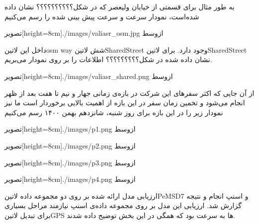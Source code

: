 به طور مثال برای قسمتی از خیابان ولیعصر که در شکل؟؟؟؟؟؟؟؟؟؟ نشان داده شده‌است، نمودار سرعت و سرعت پیش بینی شده را رسم می‌کنیم

  ‌تصویر[height=8cm]{./images/valiasr_osm.jpg}
  ‌ازوسط

 داخل این ‌لاتین{osm way} شش ‌لاتین{SharedStreet} وجود دارد. برای ‌لاتین{SharedStreet} نشان داده شده در شکل؟؟؟؟؟؟؟؟؟ اطلاعات را بر روی نمودار می‌بریم.

  ‌تصویر[height=8cm]{./images/valiasr_shared.png}
  ‌ازوسط

از آن جایی که اکثر سفرهای این شرکت در بازه‌ی زمانی جهار و نیم تا هفت بعد از ظهر انجام می‌شود و تخمین زمان سفر در این بازه از اهمیت بالایی برخوردار است ما نیز نمودار زیر را در این بازه برای روز شنبه، شانزدهم بهمن ۱۴۰۰ رسم می‌کنیم


  ‌تصویر[height=8cm]{./images/p1.png}
  ‌ازوسط


  ‌تصویر[height=8cm]{./images/p2.png}
  ‌ازوسط


  ‌تصویر[height=8cm]{./images/p3.png}
  ‌ازوسط


  ‌تصویر[height=8cm]{./images/p4.png}
  ‌ازوسط




ارزیابی مدل ارائه شده بر روی دو مجموعه داده ‌لاتین{PeMSD7} و اسنپ انجام و نتیجه گزارش شد. ارزیابی این مدل بر روی مجموعه داده‌ی اسنپ نیازمند مراحل بسیاری برای تبدیل ‌لاتین{GPS} ها به سرعت بود که همگی در این بخش توضیح داده شدند.

